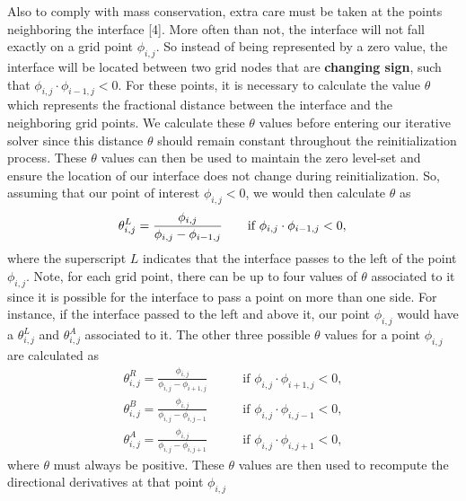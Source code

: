 \documentclass[oneside,12pt,final]{/Applications/TeX/packages/ucthesis-CA2012}
\begin{document}
\begin{mainmatter}
Also to comply with mass conservation, extra care must be taken at the points neighboring the interface [4]. More often than not, the interface will not fall exactly on a grid point $\phi_{i,j}$. So instead of being represented by a zero value, the interface will be located between two grid nodes that are \textbf{changing sign}, such that $\phi_{i,j} \cdot \phi_{i-1,j} < 0$. For these points, it is necessary to calculate the value $\theta$ which represents the fractional distance between the interface and the neighboring grid points. We calculate these $\theta$ values before entering our iterative solver since this distance $\theta$ should remain constant throughout the reinitialization process. These $\theta$ values can then be used to maintain the zero level-set and ensure the location of our interface does not change during reinitialization. So, assuming that our point of interest $\phi_{i,j} < 0$, we would then calculate $\theta$ as 
\begin{equation}\label{eqn:theta^L}
\theta_{i,j}^L = \frac{\phi_{i,j}}{\phi_{i,j}-\phi_{i-1,j}} \quad \quad \text{if $\phi_{i,j} \cdot \phi_{i-1,j} < 0$}, \\
\end{equation}
where the superscript $L$ indicates that the interface passes to the left of the point $\phi_{i,j}$. Note, for each grid point, there can be up to four values of $\theta$ associated to it since it is possible for the interface to pass a point on more than one side. For instance, if the interface passed to the left and above it, our point $\phi_{i,j}$ would have a $\theta^L_{i,j}$ and $\theta^A_{i,j}$ associated to it. The other three possible $\theta$ values for a point $\phi_{i,j}$ are calculated as
\begin{equation}\label{eqn:thetas}
\begin{aligned}
    \theta_{i,j}^R = \frac{\phi_{i,j}}{\phi_{i,j}-\phi_{i+1,j}} & \quad \quad \text{if $\phi_{i,j} \cdot \phi_{i+1,j} < 0$}, \\
    \theta_{i,j}^B = \frac{\phi_{i,j}}{\phi_{i,j}-\phi_{i,j-1}} & \quad  \quad  \text{if $\phi_{i,j} \cdot \phi_{i,j-1} < 0$}, \\
    \theta_{i,j}^A = \frac{\phi_{i,j}}{\phi_{i,j}-\phi_{i,j+1}} &  \quad \quad \text{if $\phi_{i,j} \cdot \phi_{i,j+1} < 0$},
\end{aligned}
\end{equation}
where $\theta$ must always be positive. These $\theta$ values are then used to recompute the directional derivatives at that point $\phi_{i,j}$
\begin{equation}

\end{equation}
\end{mainmatter}
\end{document}
